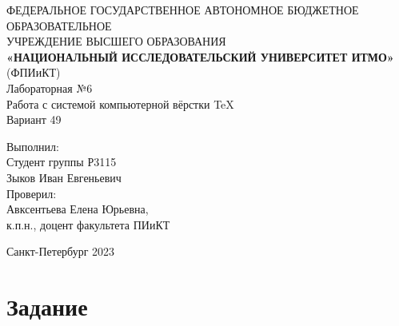 \documentclass[a4paper]{article}
\begin{document}
 
	\begin{center}
		\footnotesize{ФЕДЕРАЛЬНОЕ ГОСУДАРСТВЕННОЕ АВТОНОМНОЕ БЮДЖЕТНОЕ ОБРАЗОВАТЕЛЬНОЕ}\\ 
		\footnotesize{УЧРЕЖДЕНИЕ ВЫСШЕГО ОБРАЗОВАНИЯ}\\
		\small{\textbf{«НАЦИОНАЛЬНЫЙ ИССЛЕДОВАТЕЛЬСКИЙ УНИВЕРСИТЕТ ИТМО»}}\\[10pt]
		\normalsize{(ФПИиКТ)}\\[220pt]
		\large{Лабораторная №6}\\
		\large{Работа с системой компьютерной вёрстки TeX}\\
		\large{Вариант 49}\\[180pt]
	\end{center}
	
	\begin{flushright}
		Выполнил: \\
		Студент группы Р3115 \\
		Зыков Иван Евгеньевич \\[14pt]
		Проверил:\\
		Авксентьева Елена Юрьевна, \\
		к.п.н., доцент факультета ПИиКТ\\[80pt]
	\end{flushright}
	
	\begin{center} 
		Санкт-Петербург 2023 
	\end{center}
	\thispagestyle{empty} 
	\newpage
	\tableofcontents
	
	\newpage
	\section{Задание}
\end{document}
